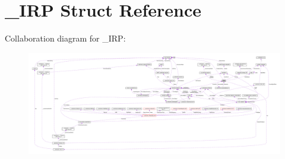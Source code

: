 \hypertarget{struct__IRP}{}\section{\+\_\+\+I\+R\+P Struct Reference}
\label{struct__IRP}


Collaboration diagram for \+\_\+\+I\+R\+P\+:
\nopagebreak
\begin{figure}[H]
\begin{center}
\leavevmode
\includegraphics[width=350pt]{struct__IRP__coll__graph}
\end{center}
\end{figure}
